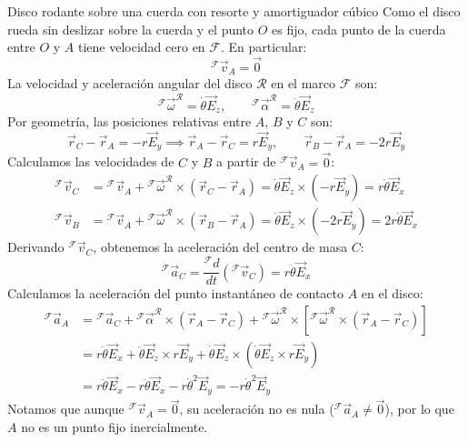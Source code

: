 \begin{solucion}{Disco rodante sobre una cuerda con resorte y amortiguador cúbico}
Como el disco rueda sin deslizar sobre la cuerda y el punto $O$ es fijo, cada punto de la cuerda entre $O$ y $A$ tiene velocidad cero en $\mathcal{F}$. En particular:
\begin{equation}
    {}^{\mathcal{F}}\vec{v}_A = \vec{0}
\end{equation}
La velocidad y aceleración angular del disco $\mathcal{R}$ en el marco $\mathcal{F}$ son:
\begin{equation}
    {}^{\mathcal{F}}\vec{\omega}^{\mathcal{R}} = \dot{\theta}\vec{E}_z, \qquad {}^{\mathcal{F}}\vec{\alpha}^{\mathcal{R}} = \ddot{\theta}\vec{E}_z
\end{equation}
Por geometría, las posiciones relativas entre $A$, $B$ y $C$ son:
\begin{equation}
    \vec{r}_C - \vec{r}_A = -r\vec{E}_y \implies \vec{r}_A - \vec{r}_C = r\vec{E}_y, \qquad \vec{r}_B - \vec{r}_A = -2r\vec{E}_y
\end{equation}
Calculamos las velocidades de $C$ y $B$ a partir de ${}^{\mathcal{F}}\vec{v}_A = \vec{0}$:
\begin{align}
    {}^{\mathcal{F}}\vec{v}_C &= {}^{\mathcal{F}}\vec{v}_A + {}^{\mathcal{F}}\vec{\omega}^{\mathcal{R}} \times (\vec{r}_C - \vec{r}_A) = \dot{\theta}\vec{E}_z \times (-r\vec{E}_y) = r\dot{\theta}\vec{E}_x \\
    {}^{\mathcal{F}}\vec{v}_B &= {}^{\mathcal{F}}\vec{v}_A + {}^{\mathcal{F}}\vec{\omega}^{\mathcal{R}} \times (\vec{r}_B - \vec{r}_A) = \dot{\theta}\vec{E}_z \times (-2r\vec{E}_y) = 2r\dot{\theta}\vec{E}_x
\end{align}
Derivando ${}^{\mathcal{F}}\vec{v}_C$, obtenemos la aceleración del centro de masa $C$:
\begin{equation}
    {}^{\mathcal{F}}\vec{a}_C = \frac{{}^{\mathcal{F}}d}{dt}({}^{\mathcal{F}}\vec{v}_C) = r\ddot{\theta}\vec{E}_x
\end{equation}
Calculamos la aceleración del punto instantáneo de contacto $A$ en el disco:
\begin{align}
    {}^{\mathcal{F}}\vec{a}_A &= {}^{\mathcal{F}}\vec{a}_C + {}^{\mathcal{F}}\vec{\alpha}^{\mathcal{R}} \times (\vec{r}_A - \vec{r}_C) + {}^{\mathcal{F}}\vec{\omega}^{\mathcal{R}} \times [{}^{\mathcal{F}}\vec{\omega}^{\mathcal{R}} \times (\vec{r}_A - \vec{r}_C)] \nonumber \\
    &= r\ddot{\theta}\vec{E}_x + \ddot{\theta}\vec{E}_z \times r\vec{E}_y + \dot{\theta}\vec{E}_z \times (\dot{\theta}\vec{E}_z \times r\vec{E}_y) \nonumber \\
    &= r\ddot{\theta}\vec{E}_x - r\ddot{\theta}\vec{E}_x - r\dot{\theta}^2\vec{E}_y = -r\dot{\theta}^2\vec{E}_y
\end{align}
Notamos que aunque ${}^{\mathcal{F}}\vec{v}_A = \vec{0}$, su aceleración no es nula (${}^{\mathcal{F}}\vec{a}_A \neq \vec{0}$), por lo que $A$ no es un punto fijo inercialmente.


\end{solucion}
